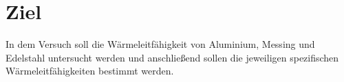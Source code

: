 \section{Ziel}

In dem Versuch soll die Wärmeleitfähigkeit von Aluminium, Messing und 
Edelstahl untersucht werden und anschließend sollen die jeweiligen 
spezifischen Wärmeleitfähigkeiten bestimmt werden.